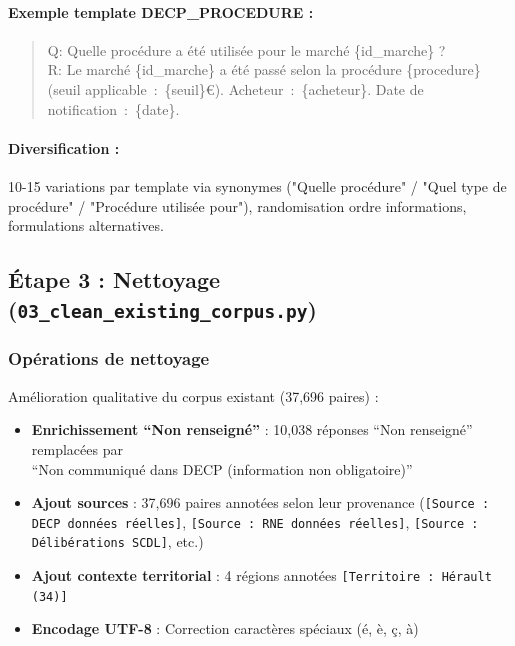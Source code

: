 \paragraph{Exemple template DECP\_PROCEDURE :}

\begin{quote}\ttfamily\small\sloppy
Q: Quelle procédure a été utilisée pour le marché \{id\_marche\} ?\\[2pt]
R: Le marché \{id\_marche\} a été passé selon la procédure \{procedure\} (seuil applicable~:\ \{seuil\}€). Acheteur~:\ \{acheteur\}. Date de notification~:\ \{date\}.
\end{quote}

\paragraph{Diversification :} 10-15 variations par template via synonymes ("Quelle procédure" / "Quel type de procédure" / "Procédure utilisée pour"), randomisation ordre informations, formulations alternatives.

\subsection{Étape 3 : Nettoyage (\texttt{03\_clean\_existing\_corpus.py})}

\subsubsection{Opérations de nettoyage}

Amélioration qualitative du corpus existant (37,696 paires) :

\begin{itemize}
    \item \textbf{Enrichissement ``Non renseigné''} : 10,038 réponses ``Non renseigné'' remplacées par\\
          ``Non communiqué dans DECP (information non obligatoire)''
    
    \item \textbf{Ajout sources} : 37,696 paires annotées selon leur provenance (\texttt{[Source : DECP données réelles]}, \texttt{[Source : RNE données réelles]}, \texttt{[Source : Délibérations SCDL]}, etc.)
    
    \item \textbf{Ajout contexte territorial} : 4 régions annotées \texttt{[Territoire : Hérault (34)]}
    
    \item \textbf{Encodage UTF-8} : Correction caractères spéciaux (é, è, ç, à)
\end{itemize}

